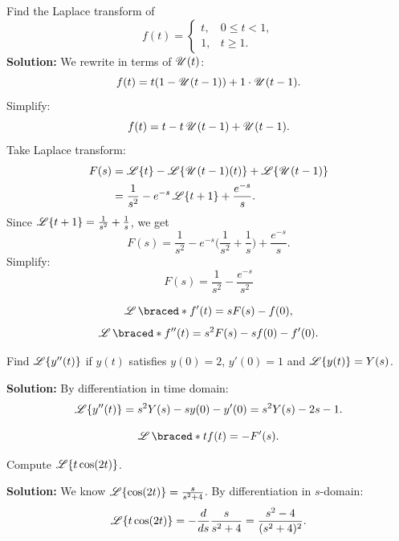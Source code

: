   \begin{example}
    Find the Laplace transform of
    \[
    f(t) = 
    \begin{cases}
    t, & 0 \leq t < 1,\\
    1, & t \geq 1.
    \end{cases}
    \]
    \textbf{Solution:}
    We rewrite in terms of $\operatorname{\mathscr{U}}(t)$:
    \[
    f(t) = t(1-\operatorname{\mathscr{U}}(t-1)) + 1\cdot \operatorname{\mathscr{U}}(t-1).
    \]
    Simplify:
    \[
    f(t) = t - t \operatorname{\mathscr{U}}(t-1) + \operatorname{\mathscr{U}}(t-1).
    \]
    Take Laplace transform:
    \begin{align*}
    F(s) &= \operatorname{\mathscr{L}}\{t\} - \operatorname{\mathscr{L}}\{\operatorname{\mathscr{U}}(t-1)(t)\} + \operatorname{\mathscr{L}}\{\operatorname{\mathscr{U}}(t-1)\}\\
    &= \frac{1}{s^2} - e^{-s}\operatorname{\mathscr{L}}\{t+1\} + \frac{e^{-s}}{s}.
    \end{align*}
    Since $\operatorname{\mathscr{L}}\{t+1\}=\frac{1}{s^2}+\frac{1}{s}$, we get
    \[
    F(s)=\frac{1}{s^2} - e^{-s}\Big(\frac{1}{s^2}+\frac{1}{s}\Big) + \frac{e^{-s}}{s}.
    \]
    Simplify:
    \[
    \boxed{F(s)=\frac{1}{s^2} - \frac{e^{-s}}{s^2}}
    \]
  \end{example}


  \begin{marginfigure}
      
  \end{marginfigure}


  \begin{theorem}
    \[
    \laplace\braced*{f'(t)} = sF(s) - f(0),
    \]
    \[
    \laplace\braced*{f''(t)} = s^2 F(s) - sf(0) - f'(0).
    \]
  \end{theorem}

  \begin{example}
    Find $\operatorname{\mathscr{L}}\{y''(t)\}$ if $y(t)$ satisfies $y(0)=2$, $y'(0)=1$ and $\operatorname{\mathscr{L}}\{y(t)\}=Y(s)$.

    \textbf{Solution:}  
    By differentiation in time domain:
    \[
    \operatorname{\mathscr{L}}\{y''(t)\} = s^2 Y(s) - s y(0) - y'(0) = s^2 Y(s) - 2s - 1.
    \]
  \end{example}


  \begin{theorem}
    \[
    \laplace\braced*{t f(t)} = -F'(s).
    \]
  \end{theorem}

  \begin{example}
    Compute $\operatorname{\mathscr{L}}\{t \cos(2t)\}$.

    \textbf{Solution:}  
    We know $\operatorname{\mathscr{L}}\{\cos(2t)\} = \frac{s}{s^2 + 4}$. By differentiation in $s$-domain:
    \[
    \operatorname{\mathscr{L}}\{t \cos(2t)\} = -\frac{d}{ds} \frac{s}{s^2 + 4} = \frac{s^2 - 4}{(s^2 + 4)^2}.
    \]
  \end{example}


